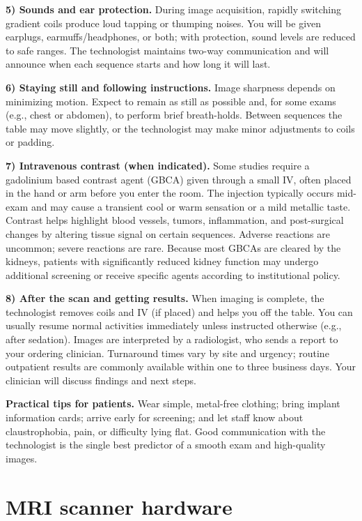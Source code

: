 \documentclass[12pt]{article}
\begin{document}
{\medskip
\noindent\textbf{5) Sounds and ear protection.} During image acquisition, rapidly switching gradient coils produce loud tapping or thumping noises. You will be given earplugs, earmuffs/headphones, or both; with protection, sound levels are reduced to safe ranges. The technologist maintains two-way communication and will announce when each sequence starts and how long it will last.

\medskip
\noindent\textbf{6) Staying still and following instructions.} Image sharpness depends on minimizing motion. Expect to remain as still as possible and, for some exams (e.g., chest or abdomen), to perform brief breath-holds. Between sequences the table may move slightly, or the technologist may make minor adjustments to coils or padding.

\medskip
\noindent\textbf{7) Intravenous contrast (when indicated).} Some studies require a gadolinium based contrast agent (GBCA) given through a small IV, often placed in the hand or arm before you enter the room. The injection typically occurs mid-exam and may cause a transient cool or warm sensation or a mild metallic taste. Contrast helps highlight blood vessels, tumors, inflammation, and post-surgical changes by altering tissue signal on certain sequences. Adverse reactions are uncommon; severe reactions are rare. Because most GBCAs are cleared by the kidneys, patients with significantly reduced kidney function may undergo additional screening or receive specific agents according to institutional policy.

\medskip
\noindent\textbf{8) After the scan and getting results.} When imaging is complete, the technologist removes coils and IV (if placed) and helps you off the table. You can usually resume normal activities immediately unless instructed otherwise (e.g., after sedation). Images are interpreted by a radiologist, who sends a report to your ordering clinician. Turnaround times vary by site and urgency; routine outpatient results are commonly available within one to three business days. Your clinician will discuss findings and next steps.

\medskip
\noindent\textbf{Practical tips for patients.} Wear simple, metal-free clothing; bring implant information cards; arrive early for screening; and let staff know about claustrophobia, pain, or difficulty lying flat. Good communication with the technologist is the single best predictor of a smooth exam and high-quality images.


\section{MRI scanner hardware}

}
\end{document}
